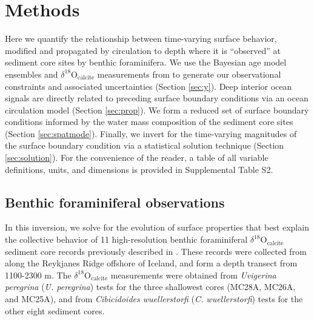 \documentclass[draft]{agujournal2019}
\begin{document}
\section{Methods}
Here we quantify the relationship between time-varying surface
behavior, modified and propagated by circulation to depth where it is
``observed'' at sediment core sites by benthic foraminifera. We use the Bayesian age model ensembles and
$\delta^{18}\mathrm{O}_{\mathrm{calcite}}$ measurements from
 to generate our observational constraints
and associated uncertainties (Section \ref{sec:y}). Deep interior ocean signals are directly
related to preceding surface boundary conditions via an ocean
circulation model (Section \ref{sec:prop}). We form a reduced set of
surface boundary conditions informed by the water mass composition of
the sediment core sites (Section \ref{sec:spatmode}). Finally, we
invert for the time-varying magnitudes of the surface boundary
condition via a statistical solution technique (Section
\ref{sec:solution}). For the convenience of the reader,
a table of all variable definitions, units, and
dimensions is provided in Supplemental Table S2.%

\subsection{Benthic foraminiferal observations \label{sec:y}}
In this inversion, we solve for the evolution of surface
properties that best explain the collective behavior of 11
high-resolution benthic foraminiferal
$\delta^{18}\mathrm{O}_{\mathrm{calcite}}$ sediment core records previously
described in . These records were
collected from along the Reykjanes Ridge offshore of Iceland, and form
a depth transect from 1100-2300 m. The
$\delta^{18}\mathrm{O}_{\mathrm{calcite}}$ measurements were obtained from
\textit{Uvigerina peregrina} (\textit{U. peregrina}) tests for the
three shallowest cores (MC28A, MC26A, and MC25A), and from
\textit{Cibicidoides wuellerstorfi} (\textit{C. wuellerstorfi}) tests
for the other eight sediment cores.
\end{document}
